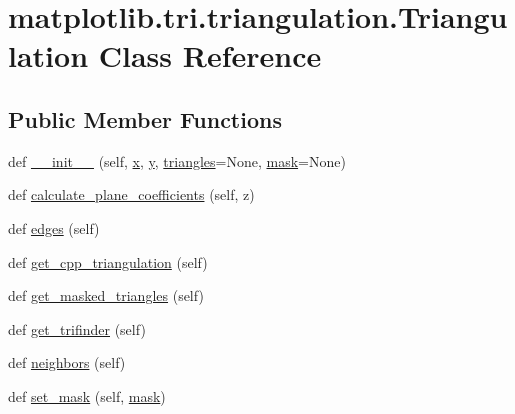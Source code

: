 \hypertarget{classmatplotlib_1_1tri_1_1triangulation_1_1Triangulation}{}\section{matplotlib.\+tri.\+triangulation.\+Triangulation Class Reference}
\label{classmatplotlib_1_1tri_1_1triangulation_1_1Triangulation}
\subsection*{Public Member Functions}
\begin{DoxyCompactItemize}
\item 
def \hyperlink{classmatplotlib_1_1tri_1_1triangulation_1_1Triangulation_a2ce4a254f5f9d40cd008345787e88ff0}{\+\_\+\+\_\+init\+\_\+\+\_\+} (self, \hyperlink{classmatplotlib_1_1tri_1_1triangulation_1_1Triangulation_aa361148318a0bd7779e1430621b5fe44}{x}, \hyperlink{classmatplotlib_1_1tri_1_1triangulation_1_1Triangulation_aff84cb603026d3c8301491543810b8e5}{y}, \hyperlink{classmatplotlib_1_1tri_1_1triangulation_1_1Triangulation_ab9d9665d45a762203258ebbc00695f95}{triangles}=None, \hyperlink{classmatplotlib_1_1tri_1_1triangulation_1_1Triangulation_a742c896bb64598790b0bf91b329c2a93}{mask}=None)
\item 
def \hyperlink{classmatplotlib_1_1tri_1_1triangulation_1_1Triangulation_a93c60832c6f7b45a1287018d3773e226}{calculate\+\_\+plane\+\_\+coefficients} (self, z)
\item 
def \hyperlink{classmatplotlib_1_1tri_1_1triangulation_1_1Triangulation_a033d2a2db0698d6459a156864a55ba6f}{edges} (self)
\item 
def \hyperlink{classmatplotlib_1_1tri_1_1triangulation_1_1Triangulation_a2b9facd01b9df05f690a87a66169aff6}{get\+\_\+cpp\+\_\+triangulation} (self)
\item 
def \hyperlink{classmatplotlib_1_1tri_1_1triangulation_1_1Triangulation_a7814c6541d4d51619ba1276c564041aa}{get\+\_\+masked\+\_\+triangles} (self)
\item 
def \hyperlink{classmatplotlib_1_1tri_1_1triangulation_1_1Triangulation_a7cb84eddc0dc9d31717bfc653b34b3ec}{get\+\_\+trifinder} (self)
\item 
def \hyperlink{classmatplotlib_1_1tri_1_1triangulation_1_1Triangulation_a01e22c19d230faee534109d3d372f862}{neighbors} (self)
\item 
def \hyperlink{classmatplotlib_1_1tri_1_1triangulation_1_1Triangulation_a2d61b372e12b79b9880d4e219fda02af}{set\+\_\+mask} (self, \hyperlink{classmatplotlib_1_1tri_1_1triangulation_1_1Triangulation_a742c896bb64598790b0bf91b329c2a93}{mask})
\end{DoxyCompactItemize}
